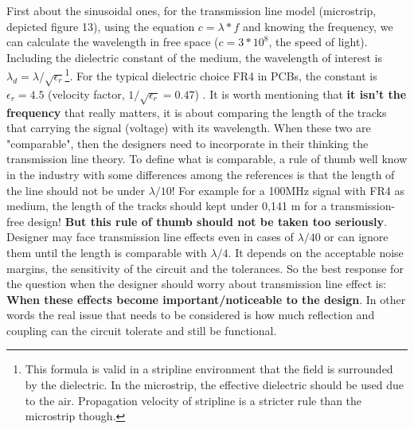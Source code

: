 \documentclass[final]{cubedoc}
\begin{document}
	
	First about the sinusoidal ones, for the transmission line model (microstrip, depicted figure 13), using the equation $ c = \lambda*f$ and knowing the frequency, we can calculate the wavelength in free space ($c = 3*10^8$, the speed of light). Including the dielectric constant of the medium, the wavelength of interest is $\lambda_d = \lambda/\sqrt{\epsilon_r}$\footnote{This formula is valid in a stripline environment that the field is surrounded by the dielectric. In the microstrip, the effective dielectric should be used due to the air. Propagation velocity of stripline is a stricter rule than the microstrip though.}. For the typical dielectric choice FR4 in PCBs, the constant is $\epsilon_r = 4.5$ (velocity factor, $1/\sqrt{\epsilon_r} = 0.47$) \cite[p.46]{williams2004circuit}.
	It is worth mentioning that \textbf{it isn't the frequency} that really matters, it is about comparing the length of the tracks that carrying the signal (voltage) with its wavelength. When these two are "comparable", then the designers need to incorporate in their thinking the transmission line theory. To define what is comparable, a rule of thumb well know in the industry with some differences among the references is that the length of the line should not be under $\lambda/10$! For example for a 100MHz signal with FR4 as medium, the length of the tracks should kept under 0,141 m for a transmission-free design! \textbf{But this rule of thumb should not be taken too seriously}. Designer may face transmission line effects even in cases of $\lambda/40$ or can ignore them until the length is comparable with $\lambda/4$. It depends on the acceptable noise margins, the sensitivity of the circuit and the tolerances. So the best response for the question when the designer should worry about transmission line effect is: \textbf{When these effects become important/noticeable to the design}. In other words the real issue that needs to be considered is how much reflection and coupling can the circuit tolerate and still be functional.
\end{document}
